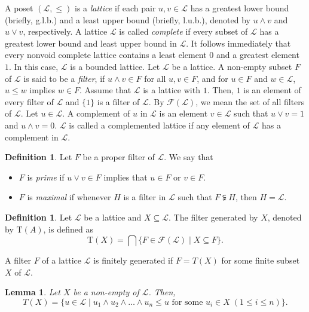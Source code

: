 \documentclass[preprint,review,10pt]{amsart}
\newtheorem{lemma}[theorem]{Lemma}
\theoremstyle{definition}
\newtheorem{definition}[theorem]{Definition}
\theoremstyle{remark}
\numberwithin{equation}{section}
\begin{document}
A poset $(\mathcal{L}, \le)$ is a \textit{lattice} if   each pair $u, v \in \mathcal{L}$ has a  greatest lower bound (briefly, g.l.b.) and a   least upper bound (briefly, l.u.b.), denoted by $u \wedge v$ and $u \vee v$, respectively. 
A lattice $\mathcal{L}$ is called \textit{complete} if every subset of $\mathcal{L}$ has a greatest lower bound and least upper bound in $\mathcal{L}$. It follows immediately that every nonvoid complete lattice contains a least element $0$ and a greatest element $1$. In this case, $\mathcal{L}$ is a bounded lattice.
Let $\mathcal{L}$ be a lattice. A non-empty subset  $F$ of $\mathcal{L}$ is said to be a \textit{filter}, if $u \wedge v \in F$ for all $u, v \in F$, and for $u \in F$ and $w \in \mathcal{L}$, $u \le w$ implies $w \in F$. Assume that $\mathcal{L}$ is a lattice with $1$. Then,  $1$ is an element of   every filter of $\mathcal{L}$ and $\{1\}$ is a filter of $\mathcal{L}$. By $\mathcal{F}(\mathcal{L})$, we mean the set of all filters of $\mathcal{L}$. Let $u \in \mathcal{L}$.  A complement of $u$ in $\mathcal{L}$ is an element $v \in \mathcal{L}$ such that $u \vee v = 1$ and $u \wedge v= 0$.   $\mathcal{L}$ is called a complemented lattice if any element of $\mathcal{L}$ has a complement in $\mathcal{L}$.


\begin{definition}
\cite{Birkhoff} Let  $F$ be a proper filter of $\mathcal{L}$. We say that 
\begin{itemize}
 \item[\rm(1)] $F$ is \textit{prime} if $u \vee v \in F$ implies that $u \in F$ or $v \in F$.
\item[\rm(2)]  $F$ is  \textit{maximal} if whenever $H$ is a filter in $\mathcal{L}$ such that $F \subsetneqq H$, then $H = \mathcal{L}$.
\end{itemize}
\end{definition}


\begin{definition} \cite{Atani1}
Let $\mathcal{L}$ be a lattice and $X \subseteq \mathcal{L}$.  The filter generated by $X$, denoted by $\text{T}(A)$,  is defined as 
$$\text{T}(X) = \bigcap \{ F \in  \mathcal{F}(\mathcal{L}) \mid   X \subseteq F \}.$$
\end{definition}

A filter $F$ of a lattice $\mathcal{L}$ is   finitely generated if $F = T(X)$ for some finite subset $X$ of $\mathcal{L}$.
\begin{lemma} \cite{Atani1}
Let $X $ be a non-empty of  $\mathcal{L}$. Then, \[T(X) = \{u \in \mathcal{L} \mid  u_1 \wedge u_2 \wedge \dots \wedge u_n \le u \text{ for some } u_i \in X \; (1 \le i \le n)\}.\]
\end{lemma}
\end{document}
